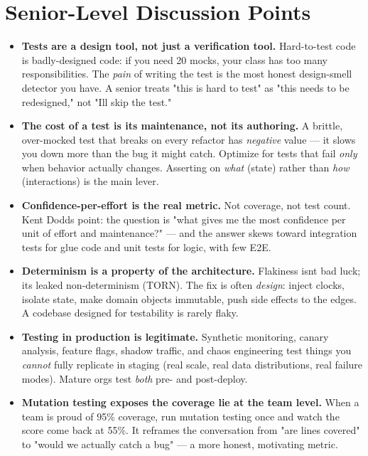 \documentclass[11pt]{article}
\begin{document}
\section{Senior-Level Discussion Points}\label{senior-level-discussion-points}

\begin{itemize}
\item
  \textbf{Tests are a design tool, not just a verification tool.} Hard-to-test code is badly-designed code: if you need 20 mocks, your class has too many responsibilities. The \emph{pain} of writing the test is the most honest design-smell detector you have. A senior treats "this is hard to test" as "this needs to be redesigned," not "I\textquotesingle ll skip the test."
\item
  \textbf{The cost of a test is its maintenance, not its authoring.} A brittle, over-mocked test that breaks on every refactor has \emph{negative} value --- it slows you down more than the bug it might catch. Optimize for tests that fail \emph{only} when behavior actually changes. Asserting on \emph{what} (state) rather than \emph{how} (interactions) is the main lever.
\item
  \textbf{Confidence-per-effort is the real metric.} Not coverage, not test count. Kent Dodds\textquotesingle{} point: the question is "what gives me the most confidence per unit of effort and maintenance?" --- and the answer skews toward integration tests for glue code and unit tests for logic, with few E2E.
\item
  \textbf{Determinism is a property of the architecture.} Flakiness isn\textquotesingle t bad luck; it\textquotesingle s leaked non-determinism (TORN). The fix is often \emph{design}: inject clocks, isolate state, make domain objects immutable, push side effects to the edges. A codebase designed for testability is rarely flaky.
\item
  \textbf{Testing in production is legitimate.} Synthetic monitoring, canary analysis, feature flags, shadow traffic, and chaos engineering test things you \emph{cannot} fully replicate in staging (real scale, real data distributions, real failure modes). Mature orgs test \emph{both} pre- and post-deploy.
\item
  \textbf{Mutation testing exposes the coverage lie at the team level.} When a team is proud of 95\% coverage, run mutation testing once and watch the score come back at 55\%. It reframes the conversation from "are lines covered" to "would we actually catch a bug" --- a more honest, motivating metric.

\end{itemize}
\end{document}
